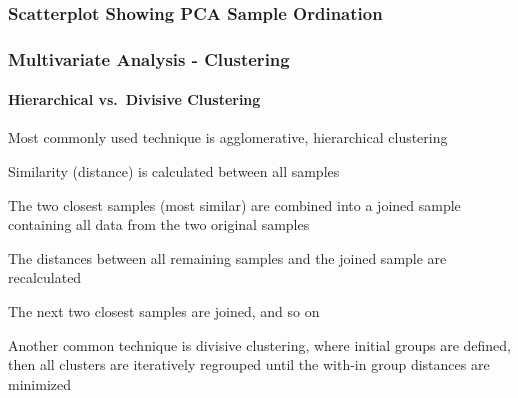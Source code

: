 \documentclass[10pt]{beamer}
\begin{document}
\begin{frame}[fragile]
\frametitle{Scatterplot Showing PCA Sample Ordination}

\begin{center}

\end{center}

\end{frame}


\begin{frame}
\frametitle{Multivariate Analysis - Clustering}
\framesubtitle{Hierarchical vs.~Divisive Clustering}

\bi
\item Most commonly used technique is {\color{blue}agglomerative,
hierarchical clustering}
	\bi
	\item Similarity (distance) is calculated between all samples
	\item The two closest samples (most similar) are combined into
          a joined sample containing all data from the two original
          samples
	\item The distances between all remaining samples and the
          joined sample are recalculated
	\item The next two closest samples are joined, and so on
	\ei
\item Another common technique is {\color{blue} divisive clustering},
where initial groups are defined, then all clusters are iteratively
regrouped until the with-in group distances are minimized
\ei 
\end{frame}
\end{document}
